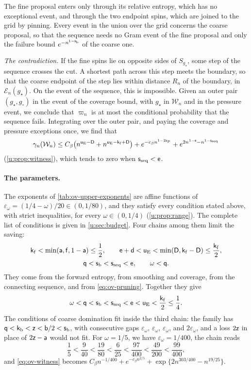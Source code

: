The fine proposal enters only through its relative entropy, which has no
exceptional event, and through the two endpoint spins, which are joined to the
grid by pinning. Every event in the union over the grid concerns the coarse
proposal, so that the sequence needs no Gram event of the fine proposal and
only the failure bound $e^{-n^{1-\mathsf{s}_{\rm b}}}$ of the coarse one.

\emph{The contradiction.} If the fine spins lie on opposite sides of
$S_{g_\star}$, some step of the sequence crosses the cut. A shortest path
across this step meets the boundary, so that the coarse endpoint of the step
lies within distance $R_n$ of the boundary, in $\mathcal E_n(g_\star)$. On
the event of the sequence, this is impossible. Given an outer pair
$(g_\star,g_\circ)$ in the event of the coverage bound, with $g_\star$ in
$\mathcal W_n$ and in the pressure event, we conclude that $\varpi_n$ is at most the
conditional probability that the sequence fails. Integrating over the outer
pair, and paying the coverage and pressure exceptions once, we find that
\begin{equation}\label{eq:ov-witness}
 \gamma_n(\mathcal W_n)\le
 C_\beta\bigl(n^{\mathsf{u}_{\rm E}-\mathsf{D}}+n^{\mathsf{u}_{\rm E}-\mathsf{k}_{\rm f}+\mathsf{D}}\bigr)
 +e^{-c_\beta n^{1-2\mathsf{z}_{\rm P}}}
 +e^{2n^{1-\mathsf{e}}-n^{1-\mathsf{s}_{\rm seq}}}
\end{equation}
(\cref{u:prop:witness}), which tends to zero when $\mathsf{s}_{\rm seq}<\mathsf{e}$.

\paragraph{The parameters.} The exponents of \cref{tab:ov-upper-exponents}
are affine functions of $\varepsilon_\omega=(1/4-\omega)/20\in(0,1/80)$, and
they satisfy every condition stated above, with strict inequalities, for
every $\omega\in(0,1/4)$ (\cref{u:prop:range}). The complete list of
conditions is given in \cref{u:sec:budget}. Four chains among them limit
the saving:
\begin{gather*}
 \mathsf{k}_{\rm f}<\min(\mathsf{a},\mathsf{f},1-\mathsf{a})\le\frac12,\qquad
 \mathsf{e}+\mathsf{d}<\mathsf{u}_{\rm E}<\min(\mathsf{D},\mathsf{k}_{\rm f}-\mathsf{D})
 \le\frac{\mathsf{k}_{\rm f}}2,\\
 \mathsf{q}<\mathsf{s}_{\rm b}<\mathsf{s}_{\rm seq}<\mathsf{e},\qquad
 \omega<\mathsf{q} .
\end{gather*}
They come from the forward entropy, from smoothing and coverage, from the
connecting sequence, and from \eqref{eq:ov-pruning}. Together they give
\[
 \omega<\mathsf{q}<\mathsf{s}_{\rm b}<\mathsf{s}_{\rm seq}<\mathsf{e}<\mathsf{u}_{\rm E}
 <\frac{\mathsf{k}_{\rm f}}2\le\frac14 .
\]
The conditions of coarse domination fit inside the third chain: the family
has $\mathsf{q}<\mathsf{k}_{\rm b}<\mathsf{z}<\mathsf{b}/2<\mathsf{s}_{\rm b}$, with consecutive gaps
$\varepsilon_\omega$, $\varepsilon_\omega$, $\varepsilon_\omega$, and
$2\varepsilon_\omega$, and a loss $2\mathsf{z}$ in place of $2\mathsf{z}-\mathsf{a}$ would
not fit. For $\omega=1/5$, we have $\varepsilon_\omega=1/400$,
the chain reads
\[
 \frac15<\frac9{40}<\frac{19}{80}<\frac6{25}<\frac{97}{400}<\frac{49}{200}
 <\frac{99}{400},
\]
and \eqref{eq:ov-witness} becomes
$C_\beta n^{-1/400}+e^{-c_\beta n^{2/5}}+\exp\{2n^{303/400}-n^{19/25}\}$.

